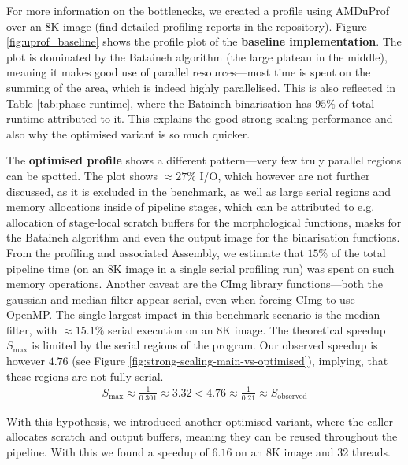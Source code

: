 \documentclass[sigconf]{acmart}
\begin{document}
For more information on the bottlenecks, we created a profile using AMDuProf over an 8K image (find detailed profiling reports in the repository). %
Figure \ref{fig:uprof_baseline} shows the profile plot of the \textbf{baseline implementation}. The plot is dominated by the Bataineh algorithm (the large plateau in the middle), meaning it makes good use of parallel resources---most time is spent on the summing of the area, which is indeed highly parallelised. This is also reflected in Table \ref{tab:phase-runtime}, where the Bataineh binarisation has $95\%$ of total runtime attributed to it. This explains the good strong scaling performance and also why the optimised variant is so much quicker.

The \textbf{optimised profile} shows a different pattern---very few truly parallel regions can be spotted. The plot shows $\approx 27\%$ I/O, which however are not further discussed, as it is excluded in the benchmark, as well as large serial regions and memory allocations inside of pipeline stages, which can be attributed to e.g. allocation of stage-local scratch buffers for the morphological functions, masks for the Bataineh algorithm and even the output image for the binarisation functions. From the profiling and associated Assembly, we estimate that $15\%$ of the total pipeline time (on an 8K image in a single serial profiling run) was spent on such memory operations.
Another caveat are the CImg library functions---both the gaussian and median filter appear serial, even when forcing CImg to use OpenMP. The single largest impact in this benchmark scenario is the median filter, with $\approx 15.1\%$ serial execution on an 8K image. The theoretical speedup $S_\text{max}$ is limited by the serial regions of the program. Our observed speedup is however $4.76$ (see Figure \ref{fig:strong-scaling-main-vs-optimised}), implying, that these regions are not fully serial.
\begin{align*}
  S_\text{max} \approx \frac{1}{0.301} \approx 3.32 <  4.76 \approx \frac{1}{0.21} \approx S_\text{observed}
\end{align*}

With this hypothesis, we introduced another optimised variant, where the caller allocates scratch and output buffers, meaning they can be reused throughout the pipeline. With this we found a speedup of $6.16$ on an 8K image and 32 threads.
\end{document}
